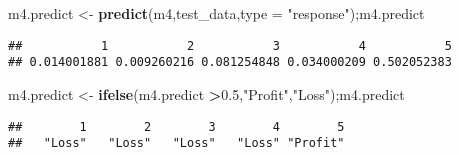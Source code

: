 \documentclass[]{article}
\newenvironment{Shaded}{\begin{snugshade}}{\end{snugshade}}
\newcommand{\KeywordTok}[1]{\textcolor[rgb]{0.13,0.29,0.53}{\textbf{#1}}}
\newcommand{\DataTypeTok}[1]{\textcolor[rgb]{0.13,0.29,0.53}{#1}}
\newcommand{\FloatTok}[1]{\textcolor[rgb]{0.00,0.00,0.81}{#1}}
\newcommand{\StringTok}[1]{\textcolor[rgb]{0.31,0.60,0.02}{#1}}
\newcommand{\OperatorTok}[1]{\textcolor[rgb]{0.81,0.36,0.00}{\textbf{#1}}}
\newcommand{\NormalTok}[1]{#1}
\begin{document}
\begin{Shaded}
\begin{Highlighting}[]
\NormalTok{m4.predict <-}\StringTok{ }\KeywordTok{predict}\NormalTok{(m4,test_data,}\DataTypeTok{type =} \StringTok{"response"}\NormalTok{);m4.predict}
\end{Highlighting}
\end{Shaded}

\begin{verbatim}
##           1           2           3           4           5 
## 0.014001881 0.009260216 0.081254848 0.034000209 0.502052383
\end{verbatim}

\begin{Shaded}
\begin{Highlighting}[]
\NormalTok{m4.predict <-}\StringTok{ }\KeywordTok{ifelse}\NormalTok{(m4.predict }\OperatorTok{>}\FloatTok{0.5}\NormalTok{,}\StringTok{"Profit"}\NormalTok{,}\StringTok{"Loss"}\NormalTok{);m4.predict}
\end{Highlighting}
\end{Shaded}

\begin{verbatim}
##        1        2        3        4        5 
##   "Loss"   "Loss"   "Loss"   "Loss" "Profit"
\end{verbatim}
\end{document}
